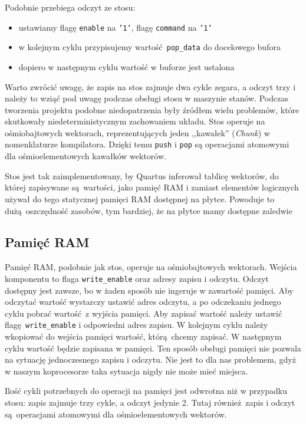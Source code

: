 Podobnie przebiega odczyt ze stosu:
\begin{itemize}
  \item ustawiamy flagę \texttt{enable} na \texttt{'1'}, flagę \texttt{command} na \texttt{'1'}
  \item w kolejnym cyklu przypisujemy wartość \texttt{pop\_data} do docelowego bufora
  \item dopiero w następnym cyklu wartość w buforze jest ustalona
\end{itemize}

Warto zwrócić uwagę, że zapis na stos zajmuje dwa cykle zegara, a odczyt trzy i należy to wziąć pod uwagę podczas obsługi stosu w maszynie stanów. Podczas tworzenia projektu podobne niedopatrzenia były źródłem wielu problemów, które skutkowały niedeterministycznym zachowaniem układu. Stos operuje na ośmiobajtowych wektorach, reprezentujących jeden ,,kawałek'' (\textit{Chunk}) w nomenklaturze kompilatora. Dzięki temu \texttt{push} i \texttt{pop} są operacjami atomowymi dla ośmioelementowych kawałków wektorów.

Stos jest tak zaimplementowany, by Quartus inferował tablicę wektorów, do której zapisywane są wartości, jako pamięć RAM i zamiast elementów logicznych używał do tego statycznej pamięci RAM dostępnej na płytce. Powoduje to dużą oszczędność zasobów, tym bardziej, że na płytce mamy dostępne zaledwie 

\subsection{Pamięć RAM}

Pamięć RAM, podobnie jak stos, operuje na ośmiobajtowych wektorach. Wejścia komponentu to flaga \texttt{write\_enable} oraz adresy zapisu i odczytu. Odczyt dostępny jest zawsze, bo w żaden sposób nie ingeruje w zawartość pamięci. Aby odczytać wartość wystarczy ustawić adres odczytu, a po odczekaniu jednego cyklu pobrać wartość z wyjścia pamięci. Aby zapisać wartość należy ustawić flagę \texttt{write\_enable} i odpowiedni adres zapisu. W kolejnym cyklu należy wkopiować do wejścia pamięci wartość, którą chcemy zapisać. W następnym cyklu wartość będzie zapisana w pamięci. Ten sposób obsługi pamięci nie pozwala na sytuację jednoczesnego zapisu i odczytu. Nie jest to dla nas problemem, gdyż w naszym koprocesorze taka sytuacja nigdy nie może mieć miejsca.

Ilość cykli potrzebnych do operacji na pamięci jest odwrotna niż w przypadku stosu: zapis zajmuje trzy cykle, a odczyt jedynie 2. Tutaj również zapis i odczyt są operacjami atomowymi dla ośmioelementowych wektorów.


